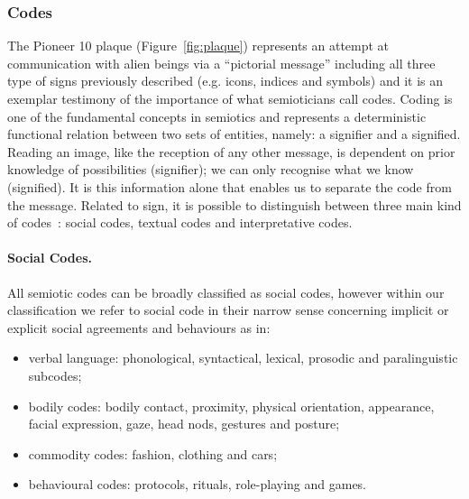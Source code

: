 \subsubsection{Codes}
The Pioneer 10 plaque (Figure~\ref{fig:plaque}) represents an attempt at communication with alien beings via a ``pictorial message'' including all three type of signs previously described (e.g. icons, indices and symbols) and it is an exemplar testimony of the importance of what semioticians call codes.
Coding is one of the fundamental concepts in semiotics and represents a deterministic functional relation between two sets of entities,  namely: a signifier and a signified.
Reading an image, like the reception of any other message, is dependent on prior knowledge of possibilities (signifier); we can only recognise what we know (signified).
It is this information alone that enables us to separate the code from the message.
Related to sign, it is possible to distinguish between three main kind of codes~\cite{Chandler2002}: social codes, textual codes and interpretative codes. %


\paragraph{Social Codes.} 
All semiotic codes can be broadly classified as social codes, however within our classification we refer to social code in their narrow sense concerning implicit or explicit 
social agreements and behaviours as in: 
\begin{itemize}
\item verbal language: phonological, syntactical, lexical, prosodic and paralinguistic subcodes;
\item bodily codes: bodily contact, proximity, physical orientation, appearance, facial expression, gaze, head nods, gestures and posture;
\item commodity codes: fashion, clothing and cars;
\item behavioural codes: protocols, rituals, role-playing and games.
\end{itemize}

